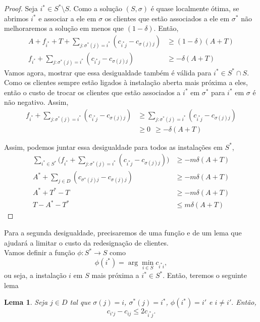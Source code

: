 \documentclass[12pt]{article}
\newtheorem{lemma}[theorem]{Lema}
\begin{document}
\begin{proof}
    Seja $i^* \in S^* \setminus S$. Como a solução $(S,\sigma)$ é quase localmente ótima, se abrimos $i^*$ e associar a ele em $\sigma$ os clientes que estão associados a ele em $\sigma^*$ não melhoraremos a solução em menos que $(1-\delta)$. Então,
    \begin{align*} A + f_{i^*} + T + \sum_{j : \sigma^*(j) = i^*} (c_{i^*j} - c_{\sigma(j)j}) &\geq (1-\delta)(A+T) \\
    f_{i^*} + \sum_{j : \sigma^*(j) = i^*} (c_{i^*j} - c_{\sigma(j)j}) &\geq -\delta(A+T)
    \end{align*} 
    Vamos agora, mostrar que essa desigualdade também é válida para $i^* \in S^* \cap S$. Como os clientes sempre estão ligados à instalação aberta mais próxima a eles, então o custo de trocar os clientes que estão associados a $i^*$ em $\sigma^*$ para $i^*$ em $\sigma$ é não negativo. Assim, 
    \begin{align*}
        f_{i^*} + \sum_{j : \sigma^*(j) = i^*} (c_{i^*j} - c_{\sigma(j)j}) &\geq \sum_{j : \sigma^*(j) = i^*} (c_{i^*j} - c_{\sigma(j)j}) \\
        &\geq 0 \: \: \geq -\delta(A+T) 
    \end{align*}

    Assim, podemos juntar essa desigualdade para todos as instalações em $S^*$,
    \begin{align*}
        \sum_{i^* \in S^*}\Big( f_{i^*} + \sum_{j : \sigma^*(j) = i^*} (c_{i^*j} - c_{\sigma(j)j})\Big) &\geq -m\delta(A+T) \\
        A^* + \sum_{j \in D} (c_{\sigma^*(j)j} - c_{\sigma(j)j}) & \geq -m\delta(A+T)\\
        A^* + T^* - T &\geq -m\delta(A+T)\\
        T - A^* - T^* &\leq m\delta(A+T)
    \end{align*}
\end{proof}
Para a segunda desigualdade, precisaremos de uma função e de um lema que ajudará a limitar o custo da redesignação de clientes. \\
Vamos definir a função $\phi : S^* \rightarrow S$ como \[\phi(i^*) = \arg\min_{i \in S} c_{i^*i},\] ou seja, a instalação $i$ em $S$ mais próxima a $i^* \in S^*$. Então, teremos o seguinte lema
\begin{lemma}
    \label{lemma:3.8}
    Seja $j \in D$ tal que $\sigma(j) = i$, $\sigma^*(j) = i^*$, $\phi(i^*) = i'$ e $i\neq i'.$ Então, \[c_{i'j} - c_{ij} \leq 2c_{i^*j}.\]
\end{lemma}
\end{document}
